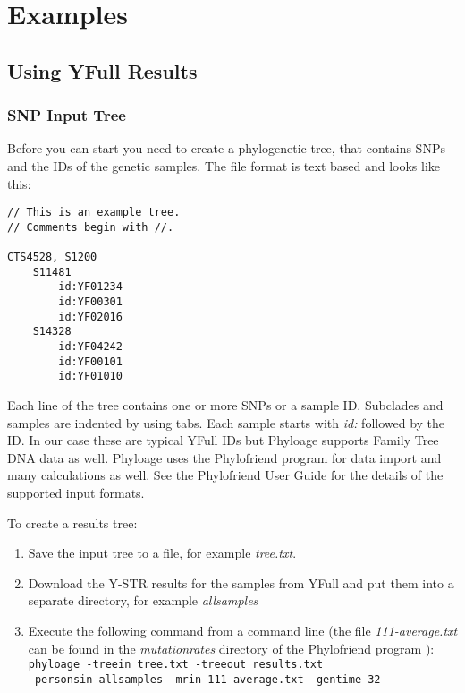 \section{Examples}

\subsection{Using YFull Results}

\subsubsection*{SNP Input Tree}

Before you can start you need to create a phylogenetic tree,
that contains SNPs and the IDs of the genetic samples. The
file format is text based and looks like this:

\begin{verbatim}
// This is an example tree.
// Comments begin with //.

CTS4528, S1200
    S11481
        id:YF01234
        id:YF00301
        id:YF02016
    S14328
        id:YF04242
        id:YF00101
        id:YF01010
\end{verbatim}

Each line of the tree contains one or more SNPs or a sample
ID. Subclades and samples are indented by using tabs. Each
sample starts with \emph{id:} followed by the ID. In our case
these are typical YFull IDs but Phyloage supports Family Tree
DNA data as well. Phyloage uses the Phylofriend
\cite{Phylofriend} program for data import and many
calculations as well. See the Phylofriend User Guide
\cite{PhylofriendUserGuide} for the details of the supported
input formats.

To create a results tree:

\begin{enumerate}
\item Save the input tree to a file, for example \emph{tree.txt}.
\item Download the Y-STR results for the samples from YFull
    and put them into a separate directory, for example
    \emph{allsamples}
\item Execute the following command from a command line
    (the file \emph{111-average.txt} can be found in the
    \emph{mutationrates} directory of the Phylofriend program
    \cite{Phylofriend}):\\
\texttt{phyloage -treein tree.txt -treeout results.txt\\
-personsin allsamples -mrin 111-average.txt -gentime 32}
\end{enumerate}

